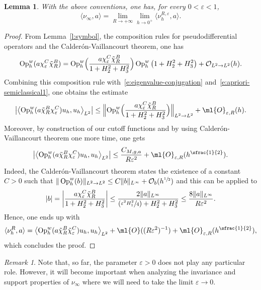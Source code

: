 \documentclass[10pt]{amsart}
\newcommand{\Psfrac}[2]{(\sfrac{#1}{#2})}
\theoremstyle{plain}
\newtheorem{lemm}[theo]{Lemma}
\theoremstyle{definition}
\theoremstyle{remark}
\newtheorem{rema}[theo]{Remark}
\newcommand{\Op}{\operatorname{Op}}
\begin{document}
\begin{lemm}\label{l:limit-measure} With the above conventions, one has, for every $0<\varepsilon<1$,
\[
\langle \nu_\infty,a\rangle =\lim_{R\to +\infty}\lim_{h\to 0^+}\langle\nu_h^{R,\varepsilon},a\rangle.
\]
\end{lemm}

\begin{proof} From Lemma~\ref{l:symbol}, the composition rules for pseudodifferential operators and the Calderón-Vaillancourt theorem, one has
\[
\Op_h^w(a\chi_\varepsilon^C\tilde{\chi}_R^B)=\Op_h^w\Bigl(\frac{a\chi_\varepsilon^C\tilde{\chi}_R^B}{1+H_2^2+H_3^2}\Bigr)\Op_h^w\left(1+H_2^2+H_3^2\right)+\mathcal{O}_{L^2\to L^2}(h).
\]
Combining this composition rule with~\eqref{e:eigenvalue-conjugation} and~\eqref{e:apriori-semiclassical1}, one obtains the estimate
\begin{equation}%
\left|\left\langle \Op_h^w(a\tilde{\chi}_R^B\chi_\varepsilon^C)u_h,u_h\right\rangle_{L^2}\right|\leq \Bigl\|\Op_h^w\Bigl(\frac{a\chi_\varepsilon^C\tilde{\chi}_R^B}{1+H_2^2+H_3^2}\Bigr)\Bigr\|_{L^2\to L^2}+\ml{O}_{\varepsilon,R}(h).
\end{equation}
Moreover, by construction of our cutoff functions and by using Calderón-Vaillancourt theorem one more time, one gets
\[
\left|\left\langle \Op_h^w(a\tilde{\chi}_R^B\chi_\varepsilon^C)u_h,u_h\right\rangle_{L^2}\right|\leq \frac{C_{M,g,a}}{R\varepsilon^2}+\ml{O}_{\varepsilon,R}(h^{\sfrac{1}{2}}).
\]
Indeed, the Calderón-Vaillancourt theorem states the existence of a constant $C>0$ such that $\|\Op_h^w(b)\|_{L^2\to L^2}\leq C\|b\|_{L^\infty}+\mathcal{O}_b(h^{\sfrac{1}{2}})$ and this can be applied to
\[
|b|=\left|\frac{a\chi_\varepsilon^C\tilde{\chi}_R^B}{1+H_2^2+H_3^2}\right|\leq\frac{2\|a\|_{L^\infty}}{\Psfrac{\varepsilon^2H_1^2}{4}+H_2^2+H_3^2}\leq\frac{8\|a\|_{L^\infty}}{R\varepsilon^2}.
\]
Hence, one ends up with
\begin{equation}%
\langle\nu_h^R,a\rangle=\left\langle \Op_h^w(a\tilde{\chi}_R^B\tilde{\chi}_\varepsilon^C)u_h,u_h\right\rangle_{L^2}+\ml{O}((R\varepsilon^2)^{-1})+\ml{O}_{\varepsilon,R}(h^{\sfrac{1}{2}}),
\end{equation}
which concludes the proof.
\end{proof}

\begin{rema}\label{r:role-epsilon}
Note that, so far, the parameter $\varepsilon>0$ does not play any particular role. However, it will become important when analyzing the invariance and support properties of $\nu_\infty$ where we will need to take the limit $\varepsilon \to 0$.
\end{rema}
\end{document}
